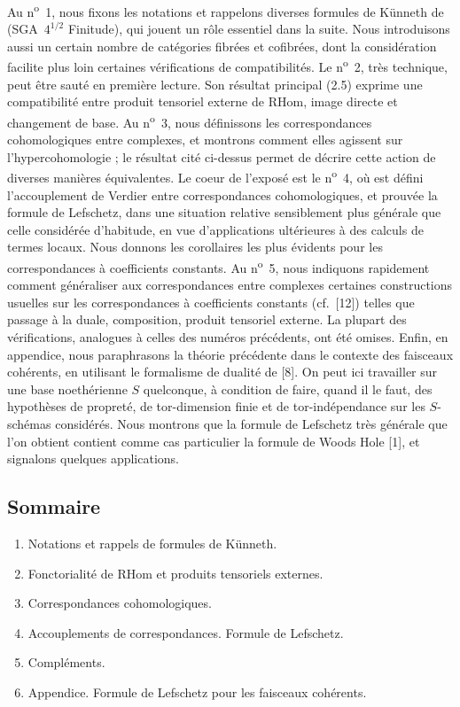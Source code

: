 \documentclass[11pt]{article}
\providecommand{\RHom}{\mathrm{RHom}}
\providecommand{\RHom}{\mathrm{RHom}}
\providecommand{\RHom}{\mathrm R\mathcal{H}om}
\begin{document}
Au n\textsuperscript{o}~1, nous fixons les notations et rappelons diverses formules de Künneth de (SGA~$4^{1/2}$ Finitude), qui jouent un rôle essentiel dans la suite. Nous introduisons aussi un certain nombre de catégories fibrées et cofibrées, dont la considération facilite plus loin certaines vérifications de compatibilités. Le n\textsuperscript{o}~2, très technique, peut être sauté en première lecture. Son résultat principal (2.5) exprime une compatibilité entre produit tensoriel externe de $\RHom$, image directe et changement de base. Au n\textsuperscript{o}~3, nous définissons les correspondances cohomologiques entre complexes, et montrons comment elles agissent sur l'hypercohomologie ; le résultat cité ci-dessus permet de décrire cette action de diverses manières équivalentes. Le coeur de l'exposé est le n\textsuperscript{o}~4, où est défini l'accouplement de Verdier entre correspondances cohomologiques, et prouvée la formule de Lefschetz, dans une situation relative sensiblement plus générale que celle considérée d'habitude, en vue d'applications ultérieures à des calculs de termes locaux. Nous donnons les corollaires les plus évidents pour les correspondances à coefficients constants. Au n\textsuperscript{o}~5, nous indiquons rapidement comment généraliser aux correspondances entre complexes certaines constructions usuelles sur les correspondances à coefficients constants (cf.~[12]) telles que passage à la duale, composition, produit tensoriel externe. La plupart des vérifications, analogues à celles des numéros précédents, ont été omises. Enfin, en appendice, nous paraphrasons la théorie précédente dans le contexte des faisceaux cohérents, en utilisant le formalisme de dualité de [8]. On peut ici travailler sur une base noethérienne $S$ quelconque, à condition de faire, quand il le faut, des hypothèses de propreté, de tor-dimension finie et de tor-indépendance sur les $S$-schémas considérés. Nous montrons que la formule de Lefschetz très générale que l'on obtient contient comme cas particulier la formule de Woods Hole [1], et signalons quelques applications.

\subsection*{Sommaire}
\begin{enumerate}[label=\arabic*.]
\item Notations et rappels de formules de Künneth.
\item Fonctorialité de $\RHom$ et produits tensoriels externes.
\item Correspondances cohomologiques.
\item Accouplements de correspondances. Formule de Lefschetz.
\item Compléments.
\item Appendice. Formule de Lefschetz pour les faisceaux cohérents.
\end{enumerate}
\end{document}
